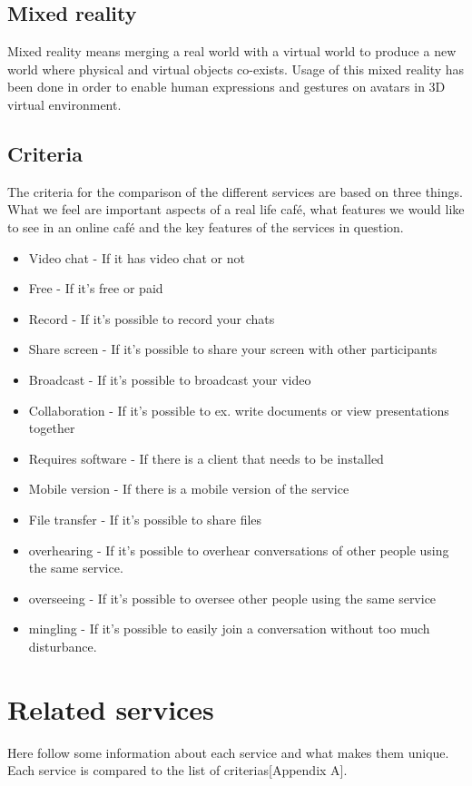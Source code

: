 \documentclass[12pt, titlepage]{article}
\begin{document}
\subsection{Mixed reality}
Mixed reality means merging a real world with a virtual world to produce a new world where physical and virtual objects co-exists. Usage of this mixed reality has been done in order to enable human expressions and gestures on avatars in 3D virtual environment\cite{7}.
\subsection{Criteria}
The criteria for the comparison of the different services are based on three things. What we feel are important aspects of a real life café, what features we would like to see in an online café and the key features of the services in question.
\begin{itemize}
\item Video chat - If it has video chat or not
\item Free - If it’s free or paid
\item Record - If it's possible to record your chats
\item Share screen - If it's possible to share your screen with other participants
\item Broadcast - If it's possible to broadcast your video
\item Collaboration - If it's possible to ex. write documents or view presentations together
\item Requires software - If there is a client that needs to be installed
\item Mobile version - If there is a mobile version of the service
\item File transfer - If it's possible to share files
\item overhearing - If it's possible to overhear conversations of other people using the same service.
\item overseeing - If it's possible to oversee other people using the same service
\item mingling - If it's possible to easily join a conversation without too much disturbance.
\end{itemize}
\section{Related services}
Here follow some information about each service and what makes them unique. Each service is compared to the list of criterias[Appendix A].
\end{document}
